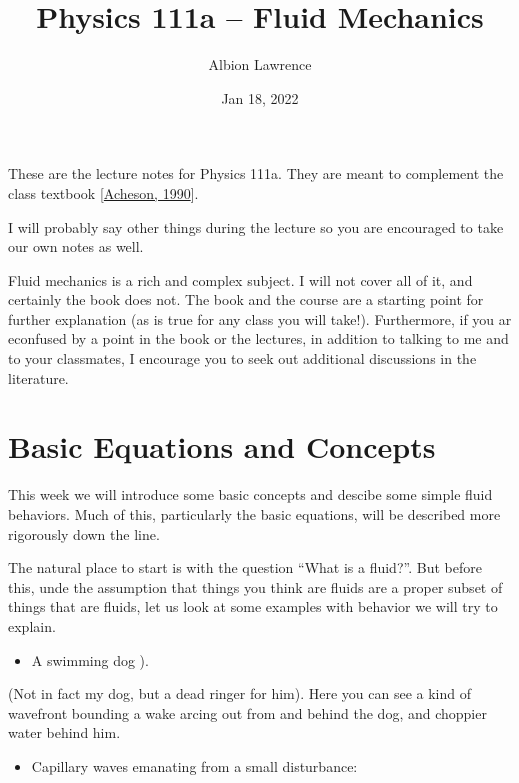 \documentclass[letterpaper,10pt,english]{jupyterBook}
\title{Physics 111a -- Fluid Mechanics}
\date{Jan 18, 2022}
\author{Albion Lawrence}
\begin{document}
\pagestyle{empty}
\sphinxmaketitle
\pagestyle{plain}
\sphinxtableofcontents
\pagestyle{normal}
\label{\detokenize{intro::doc}}


\sphinxAtStartPar
These are the lecture notes for Physics 111a. They are meant to complement
the class textbook {[}\hyperlink{cite.bibliography:id2}{Acheson, 1990}{]}.



\sphinxAtStartPar
I will probably say other things during the lecture so you are
encouraged to take our own notes as well.

\sphinxAtStartPar
Fluid mechanics is a rich and complex subject. I will not cover all of it, and
certainly the book does not. The book and the course are a starting point for
further explanation (as is true for any class you will take!). Furthermore, if
you ar econfused by a point in the book or the lectures, in addition to
talking to me and to your classmates, I encourage you to seek out additional
discussions in the literature.


\chapter{Basic Equations and Concepts}
\label{\detokenize{chapter1/Basic_intro:basic-equations-and-concepts}}\label{\detokenize{chapter1/Basic_intro::doc}}
\sphinxAtStartPar
This week we will introduce some basic concepts and descibe some simple
fluid behaviors. Much of this, particularly the basic equations, will be
described more rigorously down the line.

\sphinxAtStartPar
The natural place to start is with the question “What is a fluid?”. But
before this, unde the assumption that things you think are fluids are
a proper subset of things that are fluids, let us look at some examples
with behavior we will try to explain.
\begin{itemize}
\item {} 
\sphinxAtStartPar
A swimming dog ).

\end{itemize}

\sphinxAtStartPar
{}

\sphinxAtStartPar
(Not in fact my dog, but a dead ringer for him). Here you can see a kind
of wavefront bounding a wake arcing out from and behind the dog,
and choppier water behind him.
\begin{itemize}
\item {} 
\sphinxAtStartPar
Capillary waves emanating from a small disturbance:

\end{itemize}
\end{document}
